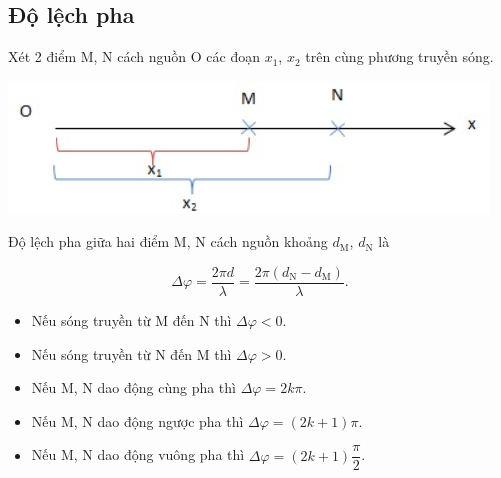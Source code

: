 \subsection{Độ lệch pha}
Xét 2 điểm M, N cách nguồn O các đoạn $x_1$, $x_2$ trên cùng phương truyền sóng.
\begin{center}
	\includegraphics[scale=0.9]{../figs/VN12-PH-10-A-006-1-V2-2.jpg}
\end{center}

Độ lệch pha giữa hai điểm M, N cách nguồn khoảng $d_{\text{M}}$, $d_{\text{N}}$ là

\begin{equation*}
	\Delta \varphi =\dfrac{2\pi d}{\lambda} = \dfrac{2\pi (d_{\text{N}}-d_{\text{M}})}{\lambda}.
\end{equation*}
\begin{itemize}
	\item Nếu sóng truyền từ M đến N thì $\Delta \varphi < 0$.
	
	\item Nếu sóng truyền từ N đến M thì $\Delta \varphi > 0$.
	
	\item Nếu M, N dao động cùng pha thì $\Delta \varphi =2k \pi$.
	\item Nếu M, N dao động ngược pha thì $\Delta \varphi = (2k+1) \pi$.
	\item Nếu M, N dao động vuông pha thì $\Delta \varphi = (2k +1) \dfrac{\pi}{2}$.
\end{itemize}
